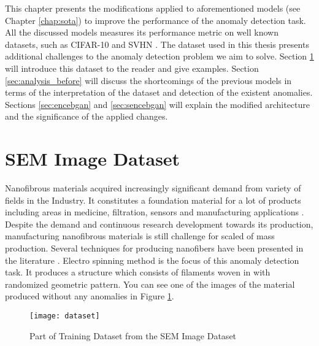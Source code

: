 
\begingroup

This chapter presents the modifications applied to aforementioned models (see Chapter \ref{chap:sota}) to improve the
performance of the anomaly detection task. All the discussed models measures its performance metric on
well known datasets, such as CIFAR-10 \cite{cifar10} and SVHN \cite{Netzer2011ReadingDI}. The
dataset used in this thesis presents additional challenges to the anomaly detection problem we aim to 
solve. Section \ref{sec:sem} will introduce this dataset to the reader and give examples. Section \ref{sec:analysis_before} will
discuss the shortcomings of the previous models in terms of the interpretation of the dataset and
detection of the existent anomalies. Sections \ref{sec:encebgan} and \ref{sec:sencebgan} will
explain the modified architecture and the significance of the applied changes.


\section{SEM Image Dataset}
\label{sec:sem}

Nanofibrous materials acquired increasingly significant demand from variety of fields in the
Industry. It constitutes a foundation material for a lot of products including areas in medicine,
filtration, sensors and manufacturing applications \cite{carrera2016defect}. Despite the demand and
continuous research development towards its production, manufacturing nanofibrous materials is still
challenge for scaled of mass production. Several techniques for producing nanofibers have been
presented in the literature \cite{carrera2016defect}. Electro spinning method is the focus of this
anomaly detection task. It produces a structure which consists of filaments woven in with randomized
geometric pattern. You can see one of the images of the material produced without any anomalies in
Figure \ref{fig:data_norm}.

\begin{figure}[h!]
	\centering
	\texttt{[image: dataset]}
	\caption{Part of Training Dataset from the SEM Image Dataset \cite{sem}}
	\label{fig:data_norm}
\end{figure}

